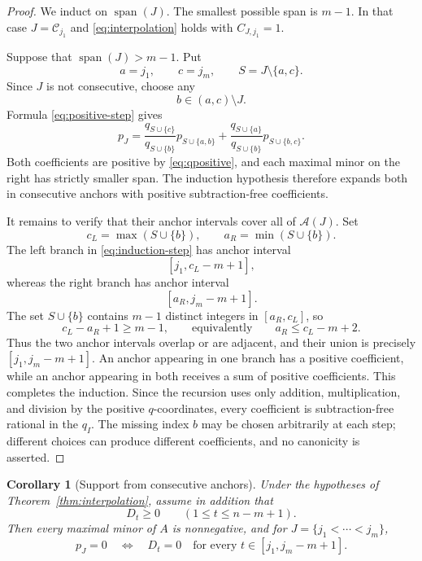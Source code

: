 \documentclass{amsart}
\numberwithin{equation}{section}
\newtheorem{corollary}[theorem]{Corollary}
\theoremstyle{definition}
\theoremstyle{remark}
\newcommand{\cC}{\mathcal C}
\begin{document}
\begin{proof}
We induct on $\operatorname{span}(J)$.  The smallest possible span is $m-1$.  In that case $J=\cC_{j_1}$ and \eqref{eq:interpolation} holds with $C_{J,j_1}=1$.

Suppose that $\operatorname{span}(J)>m-1$.  Put
\[
 a=j_1,
 \qquad c=j_m,
 \qquad S=J\setminus\{a,c\}.
\]
Since $J$ is not consecutive, choose any
\[
 b\in(a,c)\setminus J.
\]
Formula \eqref{eq:positive-step} gives
\begin{equation}\label{eq:induction-step}
 p_J
 =\frac{q_{S\cup\{c\}}}{q_{S\cup\{b\}}}
   p_{S\cup\{a,b\}}
 +\frac{q_{S\cup\{a\}}}{q_{S\cup\{b\}}}
   p_{S\cup\{b,c\}}.
\end{equation}
Both coefficients are positive by \eqref{eq:qpositive}, and each maximal minor on the right has strictly smaller span.  The induction hypothesis therefore expands both in consecutive anchors with positive subtraction-free coefficients.

It remains to verify that their anchor intervals cover all of $\mathcal A(J)$.  Set
\[
 c_L=\max(S\cup\{b\}),
 \qquad
 a_R=\min(S\cup\{b\}).
\]
The left branch in \eqref{eq:induction-step} has anchor interval
\[
 [j_1,c_L-m+1],
\]
whereas the right branch has anchor interval
\[
 [a_R,j_m-m+1].
\]
The set $S\cup\{b\}$ contains $m-1$ distinct integers in $[a_R,c_L]$, so
\[
 c_L-a_R+1\ge m-1,
 \qquad\text{equivalently}
 \qquad a_R\le c_L-m+2.
\]
Thus the two anchor intervals overlap or are adjacent, and their union is precisely
$[j_1,j_m-m+1]$.  An anchor appearing in one branch has a positive coefficient, while an anchor appearing in both receives a sum of positive coefficients.  This completes the induction.  Since the recursion uses only addition, multiplication, and division by the positive $q$-coordinates, every coefficient is subtraction-free rational in the $q_I$.  The missing index $b$ may be chosen arbitrarily at each step; different choices can produce different coefficients, and no canonicity is asserted.
\end{proof}

\begin{corollary}[Support from consecutive anchors]\label{cor:anchor-support}
Under the hypotheses of Theorem~\ref{thm:interpolation}, assume in addition that
\[
 D_t\ge0\qquad(1\le t\le n-m+1).
\]
Then every maximal minor of $A$ is nonnegative, and for
$J=\{j_1<\cdots<j_m\}$,
\begin{equation}\label{eq:zero-criterion-flag}
 p_J=0
 \quad\Longleftrightarrow\quad
 D_t=0\quad\text{for every }t\in[j_1,j_m-m+1].
\end{equation}
\end{corollary}
\end{document}
